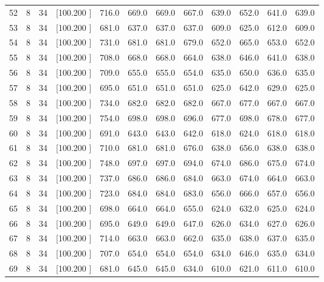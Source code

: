 \documentclass[12pt,a4paper]{article}
\begin{document}
\begin{center}
{\begin{tabular}{r r r r r r r r r r r r}
  52&  8& 34&[100.200   ]&   716.0&   669.0&   669.0&   667.0&   639.0&   652.0&   641.0&   639.0\\[-0.02in]
  53&  8& 34&[100.200   ]&   681.0&   637.0&   637.0&   637.0&   609.0&   625.0&   612.0&   609.0\\[-0.02in]
  54&  8& 34&[100.200   ]&   731.0&   681.0&   681.0&   679.0&   652.0&   665.0&   653.0&   652.0\\[-0.02in]
  55&  8& 34&[100.200   ]&   708.0&   668.0&   668.0&   664.0&   638.0&   646.0&   641.0&   638.0\\[-0.02in]
  56&  8& 34&[100.200   ]&   709.0&   655.0&   655.0&   654.0&   635.0&   650.0&   636.0&   635.0\\[-0.02in]
  57&  8& 34&[100.200   ]&   695.0&   651.0&   651.0&   651.0&   625.0&   642.0&   629.0&   625.0\\[-0.02in]
  58&  8& 34&[100.200   ]&   734.0&   682.0&   682.0&   682.0&   667.0&   677.0&   667.0&   667.0\\[-0.02in]
  59&  8& 34&[100.200   ]&   754.0&   698.0&   698.0&   696.0&   677.0&   698.0&   678.0&   677.0\\[-0.02in]
  60&  8& 34&[100.200   ]&   691.0&   643.0&   643.0&   642.0&   618.0&   624.0&   618.0&   618.0\\[-0.02in]
  61&  8& 34&[100.200   ]&   710.0&   681.0&   681.0&   676.0&   638.0&   656.0&   638.0&   638.0\\[-0.02in]
  62&  8& 34&[100.200   ]&   748.0&   697.0&   697.0&   694.0&   674.0&   686.0&   675.0&   674.0\\[-0.02in]
  63&  8& 34&[100.200   ]&   737.0&   686.0&   686.0&   684.0&   663.0&   674.0&   664.0&   663.0\\[-0.02in]
  64&  8& 34&[100.200   ]&   723.0&   684.0&   684.0&   683.0&   656.0&   666.0&   657.0&   656.0\\[-0.02in]
  65&  8& 34&[100.200   ]&   698.0&   664.0&   664.0&   655.0&   624.0&   632.0&   625.0&   624.0\\[-0.02in]
  66&  8& 34&[100.200   ]&   695.0&   649.0&   649.0&   647.0&   626.0&   634.0&   627.0&   626.0\\[-0.02in]
  67&  8& 34&[100.200   ]&   714.0&   663.0&   663.0&   662.0&   635.0&   638.0&   637.0&   635.0\\[-0.02in]
  68&  8& 34&[100.200   ]&   707.0&   654.0&   654.0&   654.0&   634.0&   646.0&   635.0&   634.0\\[-0.02in]
  69&  8& 34&[100.200   ]&   681.0&   645.0&   645.0&   634.0&   610.0&   621.0&   611.0&   610.0\\[-0.02in]

\end{tabular}}
\end{center}
\end{document}
